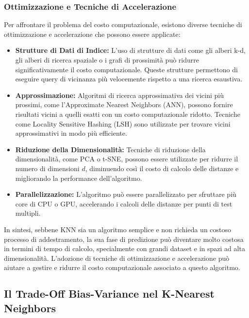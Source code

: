 \subsubsection{Ottimizzazione e Tecniche di Accelerazione}

Per affrontare il problema del costo computazionale, esistono diverse tecniche di ottimizzazione e accelerazione che possono essere applicate:

\begin{itemize}
    \item \textbf{Strutture di Dati di Indice:} L'uso di strutture di dati come gli alberi k-d, gli alberi di ricerca spaziale o i grafi di prossimità può ridurre significativamente il costo computazionale. Queste strutture permettono di eseguire query di vicinanza più velocemente rispetto a una ricerca esaustiva.
    
    \item \textbf{Approssimazione:} Algoritmi di ricerca approssimativa dei vicini più prossimi, come l'Approximate Nearest Neighbors (ANN), possono fornire risultati vicini a quelli esatti con un costo computazionale ridotto. Tecniche come Locality Sensitive Hashing (LSH) sono utilizzate per trovare vicini approssimativi in modo più efficiente.

    \item \textbf{Riduzione della Dimensionalità:} Tecniche di riduzione della dimensionalità, come PCA o t-SNE, possono essere utilizzate per ridurre il numero di dimensioni \( d \), diminuendo così il costo di calcolo delle distanze e migliorando la performance dell'algoritmo.

    \item \textbf{Parallelizzazione:} L'algoritmo può essere parallelizzato per sfruttare più core di CPU o GPU, accelerando i calcoli delle distanze per punti di test multipli.
\end{itemize}

In sintesi, sebbene KNN sia un algoritmo semplice e non richieda un costoso processo di addestramento, la sua fase di predizione può diventare molto costosa in termini di tempo di calcolo, specialmente con grandi dataset e in spazi ad alta dimensionalità. L'adozione di tecniche di ottimizzazione e accelerazione può aiutare a gestire e ridurre il costo computazionale associato a questo algoritmo.

\subsection{Il Trade-Off Bias-Variance nel K-Nearest Neighbors}


